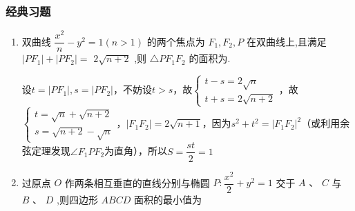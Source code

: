 \subsubsection*{经典习题}
\begin{enumerate}
    \item 双曲线 $\dfrac{{x}^{2}}{n} - {y}^{2} = 1\left( {n > 1}\right)$ 的两个焦点为 ${F}_{1},{F}_{2},P$ 在双曲线上,且满足 $\left| {P{F}_{1}}\right|  + \left| {P{F}_{2}}\right|  =$  $2\sqrt{n + 2}$ ,则 $\bigtriangleup P{F}_{1}{F}_{2}$ 的面积为.
    \begin{jieda}
        设$t = |PF_1|, s = |PF_2|$，不妨设$t > s$，故$\left\{\begin{array}{l}
             t-s = 2\sqrt{n} \\
             t+s = 2\sqrt{n+2}
        \end{array}\right.$，故$\left\{\begin{array}{l}
             t = \sqrt{n} + \sqrt{n+2} \\
             s = \sqrt{n+2} - \sqrt{n}
        \end{array}\right.$，$|F_1F_2| = 2\sqrt{n+1}$，因为$s^2+t^2 = |F_1F_2|^2$（或利用余弦定理发现$\angle{F_1PF_2}$为直角），所以$S = \dfrac{st}{2} = 1$
    \end{jieda}
    \item 过原点 $O$ 作两条相互垂直的直线分别与椭圆 $P : \dfrac{{x}^{2}}{2} + {y}^{2} = 1$ 交于 $A\text{ 、 }C$ 与 $B\text{ 、 }D$ ,则四边形 ${ABCD}$ 面积的最小值为
    \begin{jieda}
\end{jieda}
\end{enumerate}
